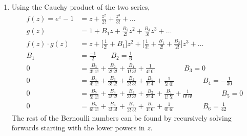\begin{enumerate}
\begin{enumerate}
              \item Using the Cauchy product of the two series,
                    \begin{align}
                        f(z) = e^z - 1  & = z + \frac{z^2}{2!} + \frac{z^3}{3!}
                        + \dots                                                      \\
                        g(z)            & = 1 + B_1 z + \frac{B_2}{2!} z^2
                        + \frac{B_3}{3!}z^3 + \dots                                  \\
                        f(z) \cdot g(z) & = z + \Bigg[ \frac{1}{2!} + B_1 \Bigg] z^2
                        + \Bigg[ \frac{1}{3!} + \frac{B_1}{2!} + \frac{B_2}{2!}
                        \Bigg] z^3 + \dots                                           \\
                        B_1             & = \frac{-1}{2} \qquad B_2 = \frac{1}{6}    \\
                        0               & = \frac{B_3}{3!\ 1!} + \frac{B_2}{2!\ 2!}
                        + \frac{B_1}{1!\ 3!} + \frac{1}{4!\ 0!} \qquad \qquad
                        B_3 = 0                                                      \\
                        0               & = \frac{B_4}{4!\ 1!} + \frac{B_3}{3!\ 2!}
                        + \frac{B_2}{2!\ 3!} + \frac{B_1}{1!\ 4!} +
                        \frac{1}{5!\ 0!} \qquad \qquad
                        B_4 = -\frac{1}{30}                                          \\
                        0               & = \frac{B_5}{5!\ 1!} + \frac{B_4}{4!\ 2!}
                        + \frac{B_3}{3!\ 3!} + \frac{B_2}{2!\ 4!} + \frac{B_1}{1!\ 5!}
                        + \frac{1}{0!\ 6!} \qquad \qquad
                        B_5 = 0                                                      \\
                        0               & = \frac{B_6}{6!\ 1!}
                        + \frac{B_4}{4!\ 3!} + \frac{B_2}{2!\ 5!}
                        + \frac{B_1}{1!\ 6!} + \frac{1}{0!\ 6!} \qquad \qquad
                        B_6 = \frac{1}{42}
                    \end{align}
                    The rest of the Bernoulli numbers can be found by recursively solving
                    forwards starting with the lower powers in $ z $.


\end{enumerate}
\end{enumerate}
